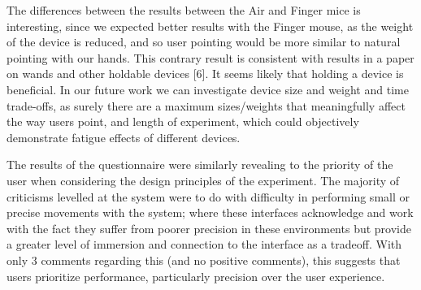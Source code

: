 The differences between the results between the Air and Finger mice is interesting, since we expected better results with the Finger mouse, as the weight of the device is reduced, and so user pointing would be more similar to natural pointing with our hands. This contrary result is consistent with results in a paper on wands and other holdable devices [6]. It seems likely that holding a device is beneficial. In our future work we can investigate device size and weight and time trade-offs, as surely there are a maximum sizes/weights that meaningfully affect the way users point, and length of experiment, which could objectively demonstrate fatigue effects of different devices.

The results of the questionnaire were similarly revealing to the priority of the user when considering the design principles of the experiment. The majority of criticisms levelled at the system were to do with difficulty in performing small or precise movements with the system; where these interfaces acknowledge and work with the fact they suffer from poorer precision in these environments but provide a greater level of immersion and connection to the interface as a tradeoff. With only 3 comments regarding this (and no positive comments), this suggests that users prioritize performance, particularly precision over the user experience.









